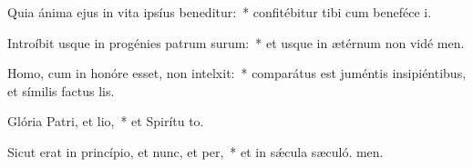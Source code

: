 \item Quia ánima ejus in vita ipsíus beneditur:~* confitébitur tibi cum beneféce i.
\item Introíbit usque in progénies patrum surum:~* et usque in ætérnum non vidé men.
\item Homo, cum in honóre esset, non intelxit:~* comparátus est juméntis insipiéntibus, et símilis factus  lis.
\item Glória Patri, et lio,~* et Spirítu to.
\item Sicut erat in princípio, et nunc, et per,~* et in sǽcula sæculó. men.
